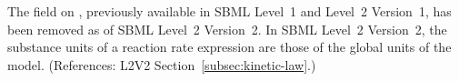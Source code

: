 The  field on \KineticLaw, previously
available in SBML Level~1 and Level~2 Version~1, has been removed
as of SBML Level~2 Version~2.  In SBML Level~2 Version~2, the
substance units of a reaction rate expression are those of the
global  units of the model.  (References: L2V2
Section~\ref{subsec:kinetic-law}.)
